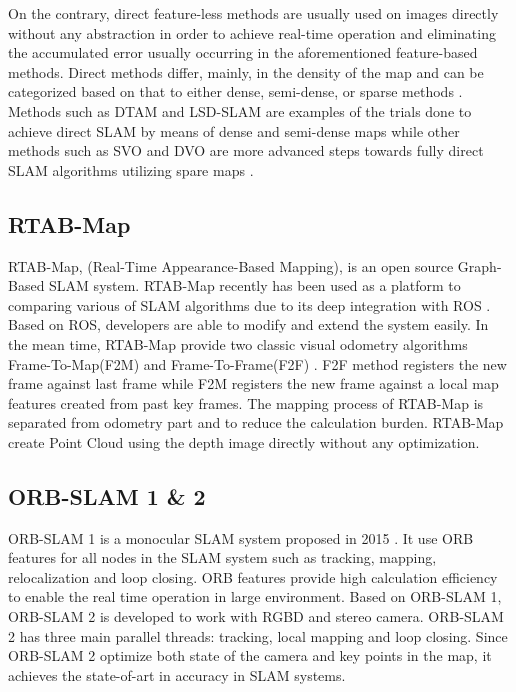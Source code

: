\documentclass[12pt]{article}
\begin{document}
On the contrary, direct feature-less methods are usually used on images directly without any abstraction \cite{taketomi2017visual} in order to achieve real-time operation and eliminating the accumulated error usually occurring in the aforementioned feature-based methods. Direct methods differ, mainly, in the density of the map and can be categorized based on that to either dense, semi-dense, or sparse methods \cite{taketomi2017visual}. Methods such as DTAM and LSD-SLAM are examples of the trials done to achieve direct SLAM by means of dense and semi-dense maps while other methods such as SVO and DVO are more advanced steps towards fully direct SLAM algorithms utilizing spare maps \cite{cadena2016past}\cite{taketomi2017visual}.

\subsection{RTAB-Map}
RTAB-Map, (Real-Time Appearance-Based Mapping), is an open source Graph-Based SLAM system. RTAB-Map recently has been used as a platform to comparing various of SLAM algorithms due to its deep integration with ROS \cite{labbe2019rtab}. Based on ROS, developers are able to modify and extend the system easily. In the mean time, RTAB-Map provide two classic visual
odometry algorithms Frame-To-Map(F2M) and Frame-To-Frame(F2F) \cite{Fraundorfer2012}. F2F method registers the new frame against last frame while F2M registers the new frame against a local map features created from past key frames. The mapping process of RTAB-Map is separated from odometry part and to reduce the calculation burden. RTAB-Map create Point Cloud using the depth image directly without any optimization. 

\subsection{ORB-SLAM 1 \& 2}
ORB-SLAM 1 is a monocular SLAM system proposed in 2015 \cite{mur2015orb}. It use ORB features for all nodes in the SLAM system such as tracking, mapping, relocalization and loop closing. ORB features provide high calculation efficiency to enable the real time operation in large environment. Based on ORB-SLAM 1, ORB-SLAM 2 is developed to work with RGBD and stereo camera.  ORB-SLAM 2 has three main parallel threads: tracking, local mapping and loop closing. Since ORB-SLAM 2 optimize both state of the camera and key points in the map, it achieves the state-of-art in accuracy in SLAM systems. 
\end{document}
